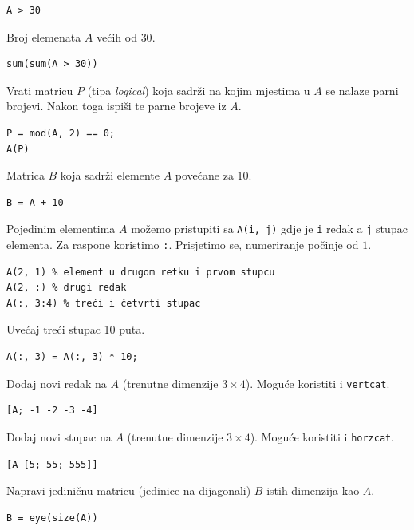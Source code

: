 \documentclass[a4paper, 10pt]{article}
\begin{document}
\begin{lstlisting}
A > 30
\end{lstlisting}

Broj elemenata $A$ većih od $30$.

\begin{lstlisting}
sum(sum(A > 30))
\end{lstlisting}

Vrati matricu $P$ (tipa \emph{logical}) koja sadrži na kojim mjestima u $A$ se nalaze parni brojevi.
Nakon toga ispiši te parne brojeve iz $A$.

\begin{lstlisting}
P = mod(A, 2) == 0;
A(P)
\end{lstlisting}

Matrica $B$ koja sadrži elemente $A$ povećane za $10$.

\begin{lstlisting}
B = A + 10
\end{lstlisting}

Pojedinim elementima $A$ možemo pristupiti sa \texttt{A(i, j)} gdje je \texttt{i} redak a \texttt{j} stupac elementa. Za raspone koristimo \texttt{:}. Prisjetimo se, numeriranje počinje od $1$.

\begin{lstlisting}
A(2, 1) % element u drugom retku i prvom stupcu
A(2, :) % drugi redak
A(:, 3:4) % treći i četvrti stupac
\end{lstlisting}

Uvećaj treći stupac 10 puta.

\begin{lstlisting}
A(:, 3) = A(:, 3) * 10;
\end{lstlisting}

Dodaj novi redak na $A$ (trenutne dimenzije $3 \times 4$). Moguće koristiti i \texttt{vertcat}.

\begin{lstlisting}
[A; -1 -2 -3 -4]
\end{lstlisting}

Dodaj novi stupac na $A$ (trenutne dimenzije $3 \times 4$). Moguće koristiti i \texttt{horzcat}.

\begin{lstlisting}
[A [5; 55; 555]]
\end{lstlisting}

Napravi jediničnu matricu (jedinice na dijagonali) $B$ istih dimenzija kao $A$.

\begin{lstlisting}
B = eye(size(A))
\end{lstlisting}
\end{document}
